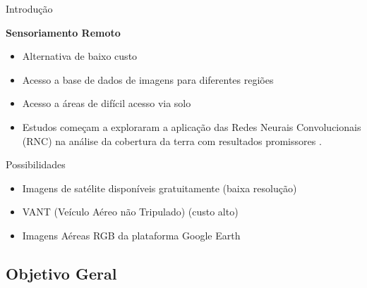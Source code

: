 \documentclass[%
  10pt,%
  aspectratio = 169,%
  compress,%
  t,%
  english,%
  brazilian,%
  tikz,
]{beamer}
\begin{document}
\begin{frame}{Introdução}

\textbf{Sensoriamento Remoto}

    \begin{itemize}
        \item Alternativa de baixo custo
        \item Acesso a base de dados de imagens para diferentes regiões
        \item Acesso a áreas de difícil acesso via solo
        \item Estudos começam a exploraram a aplicação das Redes Neurais Convolucionais (RNC) na análise da cobertura da terra com resultados promissores \cite{HU et al., 2013), (LI et al., 2020}.
    \end{itemize}

    \begin{block}{Possibilidades}
        \begin{itemize}
            \item Imagens de satélite disponíveis gratuitamente (baixa resolução)
            \item VANT (Veículo Aéreo não Tripulado) (custo alto)
            \item Imagens Aéreas RGB da plataforma Google Earth
        \end{itemize}
    \end{block}

\end{frame}



\subsection{\textbf{Objetivo Geral}}\label{ssec:intro1}
\end{document}
